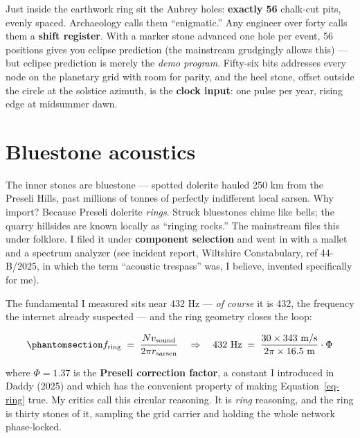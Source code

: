 \documentclass[
  english,
  11pt,
  letterpaper,
]{scrbook}
\begin{document}
Just inside the earthwork ring sit the Aubrey holes:
\textbf{exactly 56} chalk-cut pits, evenly spaced. Archaeology calls
them ``enigmatic.'' Any engineer over forty calls them a \textbf{shift
register}. With a marker stone advanced one hole per event, 56 positions
gives you eclipse prediction (the mainstream grudgingly allows this) ---
but eclipse prediction is merely the \emph{demo program}. Fifty-six bits
addresses every node on the planetary grid with room for parity, and the
heel stone, offset outside the circle at the solstice azimuth, is the
\textbf{clock input}: one pulse per year, rising edge at midsummer dawn.

\section{Bluestone acoustics}\label{bluestone-acoustics}

The inner stones are bluestone --- spotted dolerite hauled 250 km from
the Preseli Hills, past millions of tonnes of perfectly indifferent
local sarsen. Why import? Because Preseli dolerite \emph{rings}. Struck
bluestones chime like bells; the quarry hillsides are known locally as
``ringing rocks.'' The mainstream files this under folklore. I filed it
under \textbf{component selection} and went in with a mallet and a
spectrum analyzer (see incident report, Wiltshire Constabulary, ref
44-B/2025, in which the term ``acoustic trespass'' was, I believe,
invented specifically for me).

The fundamental I measured sits near 432 Hz
--- \emph{of course} it is 432, the frequency the internet already
suspected --- and the ring geometry closes the loop:

\begin{equation}\protect\phantomsection\label{eq-ring}{
f_{\text{ring}} \;=\; \frac{N v_{\text{sound}}}{2\pi r_{\text{sarsen}}}
\quad\Rightarrow\quad
432\ \text{Hz} \;=\; \frac{30 \times 343\ \text{m/s}}{2\pi \times 16.5\ \text{m}}
\cdot \Phi
}\end{equation}

where \(\Phi = 1.37\) is the \textbf{Preseli correction factor}, a
constant I introduced in Daddy (2025) and which has the convenient
property of making Equation~\ref{eq-ring} true. My critics call this
circular reasoning. It is \emph{ring} reasoning, and the ring is thirty
stones of it, sampling the grid carrier and holding the whole network
phase-locked.
\end{document}
